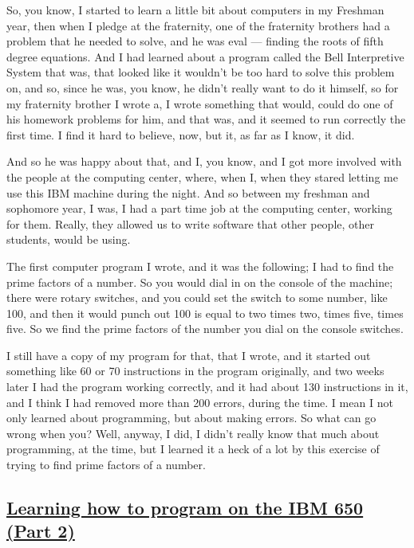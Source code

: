 \documentclass[]{article}
\begin{document}
So, you know, I started to learn a little bit about computers in my
Freshman year, then when I pledge at the fraternity, one of the
fraternity brothers had a problem that he needed to solve, and he was
eval --- finding the roots of fifth degree equations. And I had learned
about a program called the Bell Interpretive System that was, that
looked like it wouldn't be too hard to solve this problem on, and so,
since he was, you know, he didn't really want to do it himself, so for
my fraternity brother I wrote a, I wrote something that would, could do
one of his homework problems for him, and that was, and it seemed to run
correctly the first time. I find it hard to believe, now, but it, as far
as I know, it did.

And so he was happy about that, and I, you know, and I got more involved
with the people at the computing center, where, when I, when they stared
letting me use this IBM machine during the night. And so between my
freshman and sophomore year, I was, I had a part time job at the
computing center, working for them. Really, they allowed us to write
software that other people, other students, would be using.

The first computer program I wrote, and it was the following; I had to
find the prime factors of a number. So you would dial in on the console
of the machine; there were rotary switches, and you could set the switch
to some number, like 100, and then it would punch out 100 is equal to
two times two, times five, times five. So we find the prime factors of
the number you dial on the console switches.

I still have a copy of my program for that, that I wrote, and it started
out something like 60 or 70 instructions in the program originally, and
two weeks later I had the program working correctly, and it had about
130 instructions in it, and I think I had removed more than 200 errors,
during the time. I mean I not only learned about programming, but about
making errors. So what can go wrong when you? Well, anyway, I did, I
didn't really know that much about programming, at the time, but I
learned it a heck of a lot by this exercise of trying to find prime
factors of a number.

\subsection{\texorpdfstring{\href{http://webofstories.com/play/17080}{Learning
how to program on the IBM 650 (Part
2)}}{Learning how to program on the IBM 650 (Part 2)}}\label{learning-how-to-program-on-the-ibm-650-part-2}
\end{document}

